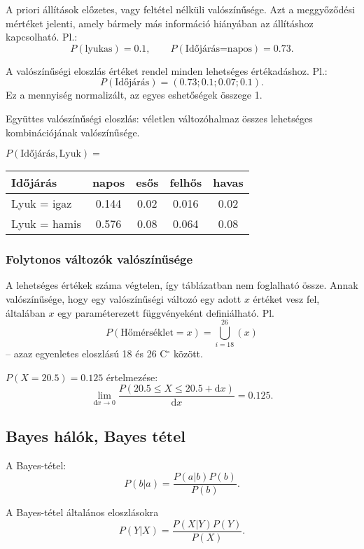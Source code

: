 A priori állítások előzetes, vagy feltétel nélküli valószínűsége. Azt a
meggyőződési mértéket jelenti, amely bármely más információ hiányában
az állításhoz kapcsolható. Pl.: \[
    P(\text{lyukas}) = 0.1, \quad\quad P(\text{Időjárás=napos}) = 0.73
.\]

A valószínűségi eloszlás értéket rendel minden lehetséges értékadáshoz. Pl.: \[
    P(\text{Időjárás}) = (0.73; 0.1; 0.07; 0.1)
.\] Ez a mennyiség normalizált, az egyes eshetőségek összege 1.

Együttes valószínűségi eloszlás: véletlen változóhalmaz összes lehetséges
kombinációjának valószínűsége.

\begin{center}
    $P(\text{Időjárás}, \text{Lyuk}) = $
    \begin{tabular}{|l|c|c|c|c|}
        \hline
        Időjárás & napos & esős & felhős & havas \\\hline
        Lyuk = igaz     & 0.144     & 0.02  & 0.016     & 0.02 \\\hline
        Lyuk = hamis    & 0.576     & 0.08  & 0.064     & 0.08 \\\hline
    \end{tabular}
\end{center}

\subsubsection{Folytonos változók valószínűsége}

A lehetséges értékek száma végtelen, így táblázatban nem foglalható össze.
Annak valószínűsége, hogy egy valószínűségi változó egy adott $x$ értéket
vesz fel, általában $x$ egy paraméterezett függvényeként definiálható. Pl. \[
    P(\text{Hőmérséklet} = x) = \bigcup_{i=18}^{26}(x)
\] -- azaz egyenletes eloszlású 18 és 26 C$^{\circ}$ között.

$P(X = 20.5) = 0.125$ értelmezése: \[
    \lim_{\text{d}x\to 0} \frac{P(20.5 \le X \le 20.5 + \text{d}x)}{\text{d}x}
    = 0.125
.\]

\subsection{Bayes hálók, Bayes tétel}

\begin{tetel}
    A Bayes-tétel: \[
        P(b|a) = \frac{P(a|b)P(b)}{P(b)}
    .\]
\end{tetel}

\begin{tetel}
    A Bayes-tétel általános eloszlásokra
    \[
        P(Y|X) = \frac{P(X|Y)P(Y)}{P(X)}
    .\]
\end{tetel}

